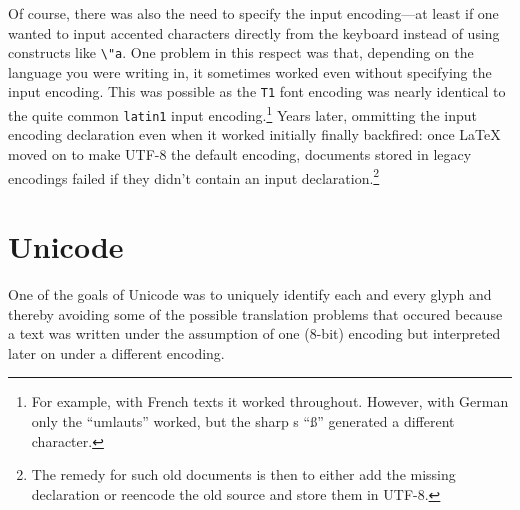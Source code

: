 \documentclass{ltugboat}
\begin{document}
Of course, there was also the need to specify the input encoding---at
least if one wanted to input accented characters directly from the
keyboard instead of using constructs like \verb=\"a=. One problem in
this respect was that, depending on the language you were writing in,
it sometimes worked even without specifying the input encoding. This
was possible as the \texttt{T1} font encoding was nearly identical to
the quite common \texttt{latin1} input encoding.\footnote{For example,
  with French texts it worked throughout. However, with German only
  the ``umlauts'' worked, but the sharp s ``ß'' generated a different
  character.}  Years later, ommitting the input encoding declaration
even when it worked initially finally backfired: once \LaTeX{} moved
on to make UTF-8 the default encoding, documents stored in legacy
encodings failed if they didn't contain an input
declaration.\footnote{The remedy for such old documents is then to
  either add the missing declaration or reencode the old source and
  store them in UTF-8.}


\section{Unicode}

One of the goals of Unicode was to uniquely identify each and every
glyph and thereby avoiding some of the possible translation problems
that occured because a text was written under the assumption of one
(8-bit) encoding but interpreted later on under a different encoding.

\vfill

\makesignature
\end{document}
